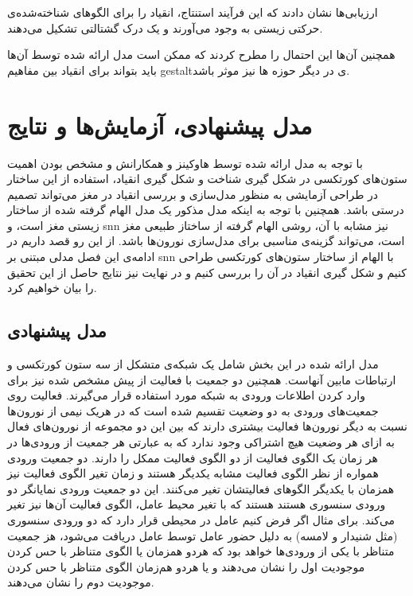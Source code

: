 \documentclass[12pt]{report}
\begin{document}
ارزیابی‌ها نشان دادند که این فرآیند استنتاج، انقیاد را برای الگو‌های شناخته‌شده‌ی حرکتی زیستی به وجود می‌آورند و یک درک گشتالتی  تشکیل می‌دهند.
	
	همچنین آن‌ها این احتمال را مطرح کردند که ممکن است مدل ارائه شده توسط آن‌ها باید بتواند برای انقیاد بین مفاهیم \gls{gestalt}ی در دیگر حوزه ها نیز موثر باشد.
	
	
	\chapter{مدل پیشنهادی، آزمایش‌ها و نتایج}
	
	با توجه به مدل ارائه شده توسط هاوکینز و همکارانش و مشخص بودن اهمیت ستون‌های کورتکسی در شکل گیری شناخت و شکل گیری انقیاد، استفاده از این ساختار در طراحی آزمایشی به منظور مدل‌سازی و بررسی انقیاد در مغز می‌تواند تصمیم درستی باشد. همچنین با توجه به اینکه مدل مذکور یک مدل الهام گرفته شده از ساختار زیستی مغز است، و \gls{snn} نیز مشابه با آن، روشی الهام گرفته از ساختاز طبیعی مغز است، می‌تواند گزینه‌ی مناسبی برای مدل‌سازی نورون‌ها باشد. از این رو قصد داریم در ادامه‌ی این فصل مدلی مبتنی بر \gls{snn} با الهام از ساختار ستون‌های کورتکسی طراحی کنیم و شکل گیری انقیاد در آن را بررسی کنیم و در نهایت نیز نتایج حاصل از این تحقیق را بیان خواهیم کرد.
	
	\section{مدل پیشنهادی}
	
	مدل ارائه شده در این بخش شامل یک شبکه‌ی متشکل از سه ستون کورتکسی و ارتباطات مابین آنهاست. همچنین دو جمعیت با فعالیت از پیش مشخص شده نیز برای وارد کردن اطلاعات ورودی به شبکه مورد استفاده قرار می‌گیرند. فعالیت روی جمعیت‌های ورودی به دو وضعیت تقسیم شده است که در هریک نیمی از نورون‌ها نسبت به دیگر نورون‌ها فعالیت بیشتری دارند که بین این دو مجموعه از نورون‌های فعال به ازای هر وضعیت هیچ اشتراکی وجود ندارد که به عبارتی هر جمعیت از ورودی‌ها در هر زمان یک الگوی فعالیت از دو الگوی فعالیت ممکل را دارند. دو جمعیت ورودی همواره از نظر الگوی فعالیت مشابه یکدیگر هستند و زمان تغیر الگوی فعالیت نیز همزمان با یکدیگر الگو‌های فعالیتشان تغیر می‌کنند. این دو جمعیت ورودی نمایانگر دو ورودی سنسوری هستند هستند که با تغیر محیط عامل، الگوی فعالیت آن‌ها نیز تغیر می‌کند. برای مثال اگر فرض کنیم عامل در محیطی قرار دارد که دو ورودی سنسوری (مثل شنیدار و لامسه) به دلیل حضور عامل توسط عامل دریافت می‌شود، هز جمعیت متناظر با یکی از ورودی‌ها خواهد بود که هردو همزمان یا الگوی متناظر با حس کردن موجودیت اول را نشان‌ می‌دهند و یا هردو هم‌زمان الگوی متناظر با حس کردن موجودیت دوم را نشان می‌دهند.
	
\end{document}
